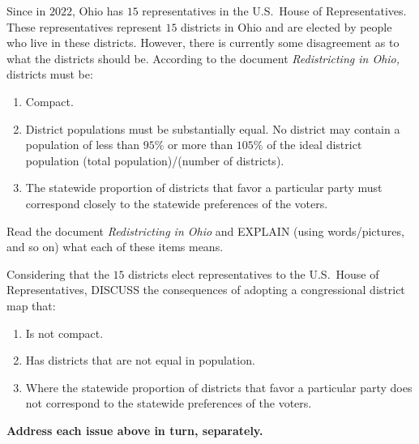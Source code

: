 \documentclass[noauthor,nooutcomes,hints,handout,12pt]{ximera}
\begin{document}
\begin{question}
  Since in $2022$, Ohio  has $15$ representatives in the
  U.S.\ House of Representatives. These representatives represent $15$
  districts in Ohio and are elected by people who live in these
  districts. However, there is currently some disagreement as to what
  the districts should be. According to the document
  \textit{Redistricting in Ohio,} districts must be:
  \begin{enumerate}
  \item Compact.
  \item District populations must be substantially equal. No district
    may contain a population of less than $95\%$ or more than $105\%$
    of the ideal district population (total population)/(number of
    districts).
  \item The statewide proportion of districts that favor a particular
    party must correspond closely to the statewide preferences of the
    voters.
  \end{enumerate}
  Read the document \textit{Redistricting in Ohio} and EXPLAIN (using words/pictures, and so on) what each of these items means. 
\end{question}


\mynewpage

\begin{question}
  Considering that the $15$ districts elect representatives to the
  U.S.\ House of Representatives, DISCUSS the consequences of adopting
  a congressional district map that:
  \begin{enumerate}
  \item Is not compact.
  \item Has districts that are not equal in population.
  \item Where the statewide proportion of districts that favor a
    particular party does not correspond to the statewide preferences
    of the voters.
  \end{enumerate}
  \textbf{Address each issue above in turn, separately.} 
\end{question}
\end{document}
